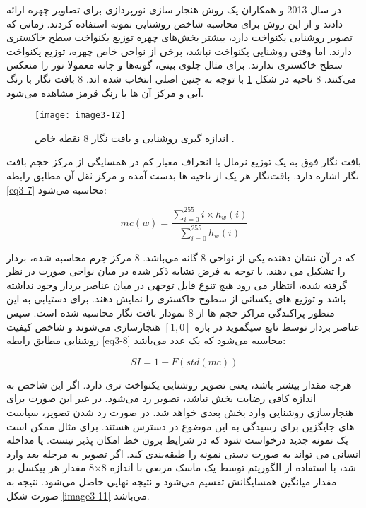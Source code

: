 \noindent
در سال 2013  و همکاران \cite{6196234} یک روش هنجار سازی نورپردازی برای تصاویر چهره ارائه دادند و از این روش برای محاسبه شاخص روشنایی نمونه   استفاده کردند. زمانی که تصویر روشنایی یکنواخت دارد، بیشتر بخش‌های چهره توزیع یکنواخت سطح خاکستری دارند. اما وقتی روشنایی یکنواخت نباشد، برخی از نواحی خاص چهره، توزیع یکنواخت سطح خاکستری ندارند. برای مثال جلوی بینی، گونه‌ها و چانه معمولا نور را منعکس می‌کنند. 8 ناحیه در شکل \ref{image3-12} با توجه به چنین اصلی انتخاب شده اند. 8 بافت نگار با رنگ آبی و مرکز آن ها با رنگ قرمز مشاهده می‌شود.

\begin{figure}[h]
\centering
  \texttt{[image: image3-12]}
  \caption{اندازه گیری روشنایی و بافت نگار 8 نقطه خاص \cite{6196234}.}
  \label{image3-12}
\end{figure}

 بافت نگار فوق به یک توزیع نرمال با انحراف معیار کم در همسایگی از مرکز حجم بافت نگار اشاره دارد. بافت‌نگار هر یک از ناحیه ها بدست آمده و مرکز ثقل آن مطابق رابطه \ref{eq3-7} محاسبه می‌شود:

\begin{equation}
\label{eq3-7}
mc\left(w\right)=\frac{\sum_{i=0}^{255}{i\times h_w(i)}}{\sum_{i=0}^{255}{h_w(i)}}		
\end{equation}

\noindent
که در آن  نشان دهنده یکی از نواحی 8 گانه می‌باشد. 8 مرکز جرم محاسبه شده، بردار  را تشکیل می دهند. با توجه به فرض تشابه ذکر شده در میان نواحی صورت در نظر گرفته شده، انتظار می رود هیچ تنوع قابل توجهی در میان عناصر بردار وجود نداشته باشد و توزیع های یکسانی از سطوح خاکستری را نمایش دهند. برای دستیابی به این منظور پراکندگی مراکز حجم ها از 8 نمودار بافت نگار محاسبه شده است. سپس عناصر بردار  توسط تابع سیگموید  در بازه $[1,0]$ هنجارسازی می‌شوند و شاخص کیفیت روشنایی مطابق رابطه \ref{eq3-8} محاسبه می‌شود که یک عدد می‌باشد:

\begin{equation}
\label{eq3-8}
SI=1-F(std\left(mc\right))	
\end{equation}

\noindent
هرچه مقدار  بیشتر باشد، یعنی تصویر روشنایی یکنواخت تری دارد. اگر این شاخص به اندازه کافی رضایت بخش نباشد، تصویر رد می‌شود. در غیر این صورت برای هنجارسازی روشنایی وارد بخش بعدی خواهد شد. در صورت رد شدن تصویر، سیاست های جایگزین برای رسیدگی به این موضوع در دسترس هستند. برای مثال ممکن است یک نمونه جدید درخواست شود که در شرایط برون خط امکان پذیر نیست. یا مداخله انسانی می تواند به صورت دستی نمونه را طبقه‌بندی کند. اگر تصویر به مرحله بعد وارد شد، با استفاده از الگوریتم  توسط یک ماسک مربعی با اندازه 8×8 مقدار هر پیکسل بر مقدار میانگین همسایگانش تقسیم می‌شود و نتیجه نهایی حاصل می‌شود. نتیجه به صورت شکل \ref{image3-11} می‌باشد.

